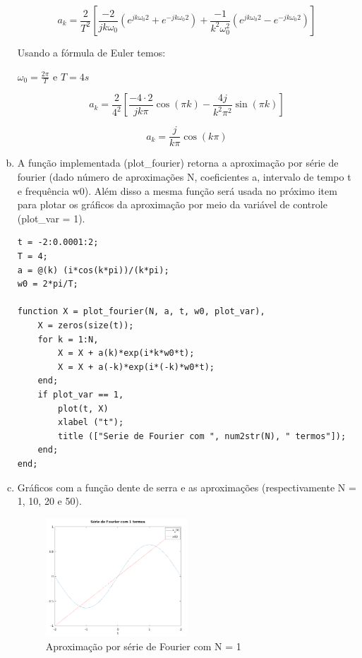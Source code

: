 \documentclass{article}
\begin{document}
\begin{enumerate}[(a)]
\begin{equation}
    a_k = \frac{2}{T^2} \left [ \frac{-2}{jk\omega_0} \left ( e^{jk\omega_0 2} + e^{-jk\omega_0 2} \right ) + \frac{-1}{k^2 \omega_0 ^2} \left ( e^{jk\omega_0 2} - e^{-jk\omega_0 2} \right ) \right ]
\end{equation}


Usando a fórmula de Euler temos:

\begin{center}
    $\omega_0 = \frac{2\pi}{T}$ e $T = 4s$
\end{center}

\begin{equation}
    a_k = \frac{2}{4^2} \left [ \frac{-4 \cdot 2}{jk\pi}\cos(\pi k) - \frac{4j}{k^2 \pi^2}\sin(\pi k) \right ]
\end{equation}

\[
    \boxed{a_k = \frac{j}{k \pi} \cos(k \pi)}
\]

\break\vfill

\item
A função implementada (plot\_fourier) retorna a aproximação por série de fourier (dado número de aproximações N, coeficientes a, intervalo de tempo t e frequência w0). Além disso a mesma função será usada no próximo item para plotar os gráficos da aproximação por meio da variável de controle (plot\_var = 1).

\begin{lstlisting}
t = -2:0.0001:2;
T = 4;
a = @(k) (i*cos(k*pi))/(k*pi);
w0 = 2*pi/T;

function X = plot_fourier(N, a, t, w0, plot_var),
    X = zeros(size(t));
    for k = 1:N,
        X = X + a(k)*exp(i*k*w0*t);
        X = X + a(-k)*exp(i*(-k)*w0*t);
    end;
    if plot_var == 1,
        plot(t, X)
        xlabel ("t");
        title (["Serie de Fourier com ", num2str(N), " termos"]);
    end;
end;
\end{lstlisting}

\item

 Gráficos com a função dente de serra e as aproximações (respectivamente N = 1, 10, 20 e 50).

 \begin{figure}[h!]
 \centering
 \includegraphics[width=0.5\textwidth]{images/plot_n1.png}
     \caption{Aproximação por série de Fourier com N = 1}
 \end{figure}


\end{enumerate}
\end{document}
